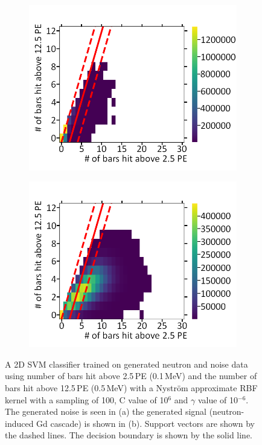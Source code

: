\begin{figure}[!h]
\centering
\begin{subfigure}{.5\textwidth}
  \centering
  \includegraphics[width=\linewidth]{Chapter4/Figs/Raster/noiseNeutronSVM_C1e6_g1e-6MedText.png}
  \captionsetup{width=.9\linewidth}
  \caption{}
  \label{subFig:noiseNeutronSVM_C1e6_g1e-6}
\end{subfigure}%
\begin{subfigure}{.5\textwidth}
  \centering
  \includegraphics[width=\linewidth]{Chapter4/Figs/Raster/signalNeutronSVM_C1e6_g1e-6MedText.png}
  \captionsetup{width=.9\linewidth}
  \caption{}
  \label{subFig:signalNeutronSVM_C1e6_g1e-6}
\end{subfigure}
\caption[A 2D SVM classifier trained on generated neutron and noise data.]{A 2D SVM classifier trained on generated neutron and noise data using number of bars hit above 2.5\,PE (0.1\,MeV) and the number of bars hit above 12.5\,PE (0.5\,MeV) with a Nyström approximate RBF kernel with a sampling of 100, C value of 10$^6$ and $\gamma$ value of 10$^{-6}$. The generated noise is seen in (a) the generated signal (neutron-induced Gd cascade) is shown in (b). Support vectors are shown by the dashed lines. The decision boundary is shown by the solid line.}
\label{fig:signalAndNoiseNeutronSVM_C1e6_g1e-6}
\end{figure}

